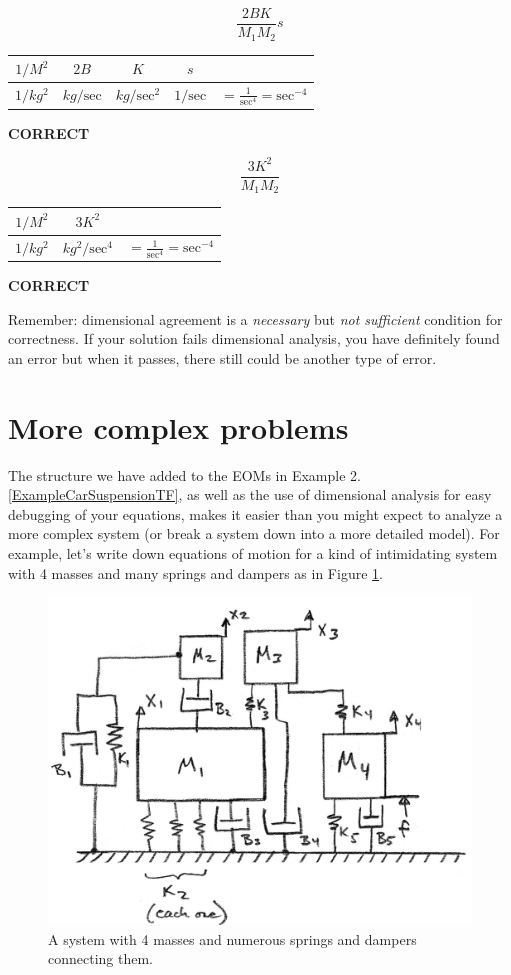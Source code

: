 \begin{Example}
\[
\frac{2BK}{M_1M_2}s
\]


\begin{tabular}{c|c|c|c|c}
$1/M^2$	  & $2B$		& $K$	& $s$ & \\ \hline
$1/kg^2$  & $kg/\mathrm{sec}$	& $kg/\mathrm{sec}^2$	& $1/\mathrm{sec}$	& $= \frac{1}{\mathrm{sec}^4} = \mathrm{sec}^{-4}$
\end{tabular}
\hspace{0.25in}  {\bf CORRECT}



\[
\frac{3K^2}{M_1M_2}
\]

\begin{tabular}{c|c|c}
$1/M^2$	& $3K^2$   & \\ \hline
$1/kg^2$  & $kg^2/\mathrm{sec}^4$	& $= \frac{1}{\mathrm{sec}^4} = \mathrm{sec}^{-4}$
\end{tabular}\hspace{0.25in}  {\bf CORRECT}

\end{Example}

Remember: dimensional agreement is a {\it necessary} but {\it not sufficient} condition
for correctness.  If your solution fails dimensional analysis, you have definitely found
an error but when it passes, there still could be another type of error.



\section{More complex problems}
The structure we have added to the EOMs in Example 2.\ref{ExampleCarSuspensionTF}, as well as the
use of dimensional analysis for easy debugging of your equations, makes it easier than you
might expect to analyze a more complex system (or break a system down into a more detailed model).
For example, let's write down equations of motion for a kind of intimidating
system with 4 masses and many springs and
dampers as in Figure \ref{complexDynSystem}.


\begin{figure}\centering
\includegraphics[width=120mm]{figs02/00933a.png}
\caption{A system with 4 masses and numerous springs and dampers connecting them.}
\label{complexDynSystem}
\end{figure}

